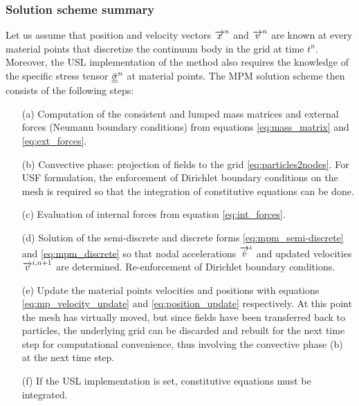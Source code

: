 \subsubsection{Solution scheme summary}
Let us assume that position and velocity vectors  ${\overrightarrow{x}}^n$ and ${\overrightarrow{v}}^n$ are known at every material points that discretize the continuum body in the grid at time $t^n$. Moreover, the USL implementation of the method also requires the knowledge of the specific stress tensor ${\underline{\underline{\bar{\sigma}}}}^n$ at material points. The MPM solution scheme then consists of the following steps:
\begin{itemize}
\item[(a)] Computation of the consistent and lumped mass matrices and external forces (Neumann boundary conditions) from equations \eqref{eq:mass_matrix} and \eqref{eq:ext_forces}.
\item[(b)] Convective phase: projection of fields to the grid \eqref{eq:particles2nodes}. For USF formulation, the enforcement of Dirichlet boundary conditions on the mesh is required so that the integration of constitutive equations can be done.
\item[(c)] Evaluation of internal forces from equation \eqref{eq:int_forces}.
\item[(d)] Solution of the semi-discrete and discrete forms \eqref{eq:mpm_semi-discrete} and \eqref{eq:mpm_discrete} so that nodal accelerations ${\overrightarrow{\dot{v}}}^i$ and updated velocities ${\overrightarrow{v}}^{i,n+1}$ are determined. Re-enforcement of Dirichlet boundary conditions.
\item[(e)] Update the material points velocities and positions with equations \eqref{eq:mp_velocity_update} and \eqref{eq:position_update} respectively. At this point the mesh has virtually moved, but since fields have been transferred back to particles, the underlying grid can be discarded and rebuilt for the next time step for computational convenience, thus involving the convective phase (b) at the next time step. 
\item[(f)] If the USL implementation is set, constitutive equations must be integrated.
\end{itemize}

